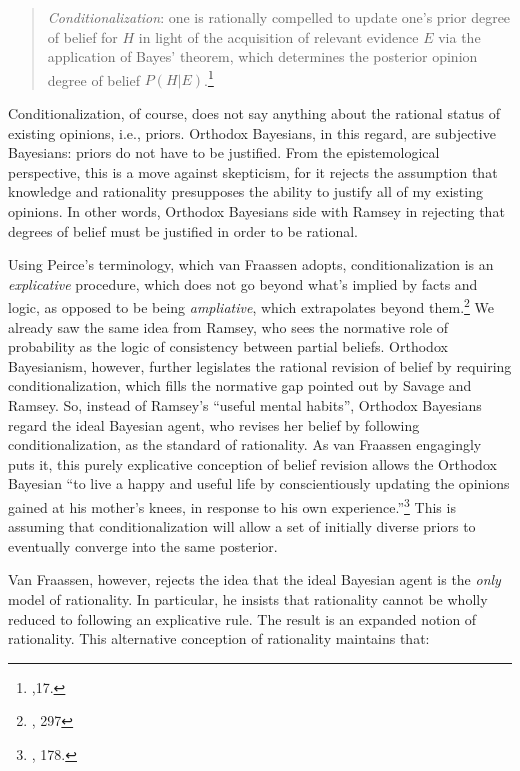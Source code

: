 \begin{quote}
\emph{Conditionalization}: one is rationally compelled to update one's
prior degree of belief for \(H\) in light of the acquisition of relevant
evidence \(E\) via the application of Bayes' theorem, which determines
the posterior opinion degree of belief \(P(H|E)\).\footnote{\cite{beliefuly},17.}
\end{quote}

Conditionalization, of course, does not say anything about the rational
status of existing opinions, i.e., priors. Orthodox Bayesians, in this
regard, are subjective Bayesians: priors do not have to be justified.
From the epistemological perspective, this is a move against skepticism,
for it rejects the assumption that knowledge and rationality presupposes
the ability to justify all of my existing opinions. In other words,
Orthodox Bayesians side with Ramsey in rejecting that degrees of belief
must be justified in order to be rational.

Using Peirce's terminology, which van Fraassen adopts,
conditionalization is an \emph{explicative} procedure, which does not go
beyond what's implied by facts and logic, as opposed to be being
\emph{ampliative}, which extrapolates beyond them.\footnote{\cite{probabilityofinduction}, 297} We already saw the same idea from Ramsey,
who sees the normative role of probability as the logic of consistency
between partial beliefs. Orthodox Bayesianism, however, further
legislates the rational revision of belief by requiring
conditionalization, which fills the normative gap pointed out by Savage
and Ramsey. So, instead of Ramsey's ``useful mental habits'', Orthodox
Bayesians regard the ideal Bayesian agent, who revises her belief by
following conditionalization, as the standard of rationality. As van
Fraassen engagingly puts it, this purely explicative conception of
belief revision allows the Orthodox Bayesian ``to live a happy and
useful life by conscientiously updating the opinions gained at his
mother's knees, in response to his own experience.''\footnote{\cite{bvflaws}, 178.} This is assuming that
conditionalization will allow a set of initially diverse priors to
eventually converge into the same posterior.

Van Fraassen, however, rejects the idea that the ideal Bayesian agent is
the \emph{only} model of rationality. In particular, he insists that
rationality cannot be wholly reduced to following an explicative rule.
The result is an expanded notion of rationality. This alternative
conception of rationality maintains that:

